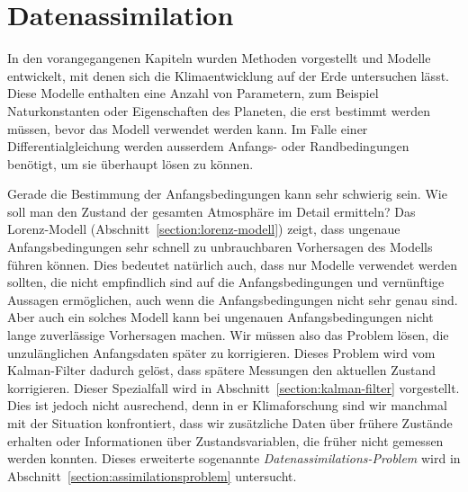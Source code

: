 %
%
%
\chapter{Datenassimilation\label{chapter:assimilation}}
In den vorangegangenen Kapiteln wurden Methoden vorgestellt
und Modelle entwickelt, mit denen sich die Klimaentwicklung auf der
Erde untersuchen lässt.
Diese Modelle enthalten eine Anzahl von Parametern, zum Beispiel
Naturkonstanten oder Eigenschaften des Planeten, die erst bestimmt
werden müssen, bevor das Modell verwendet werden kann.
Im Falle einer Differentialgleichung werden ausserdem Anfangs-
oder Randbedingungen benötigt, um sie überhaupt lösen zu können.

Gerade die Bestimmung der Anfangsbedingungen kann sehr schwierig sein.
Wie soll man den Zustand der gesamten Atmosphäre im Detail ermitteln?
Das Lorenz-Modell (Abschnitt~\ref{section:lorenz-modell}) zeigt, dass
ungenaue Anfangsbedingungen sehr schnell zu unbrauchbaren Vorhersagen
des Modells führen können.
Dies bedeutet natürlich auch, dass nur Modelle verwendet werden sollten,
die nicht empfindlich sind auf die Anfangsbedingungen und vernünftige
Aussagen ermöglichen, auch wenn die Anfangsbedingungen nicht sehr genau 
sind.
Aber auch ein solches Modell kann bei ungenauen Anfangsbedingungen 
nicht lange zuverlässige Vorhersagen machen.
Wir müssen also das Problem lösen, die unzulänglichen Anfangsdaten 
später zu korrigieren.
Dieses Problem wird vom Kalman-Filter dadurch gelöst, dass spätere
Messungen den aktuellen Zustand korrigieren.
Dieser Spezialfall wird in Abschnitt~\ref{section:kalman-filter}
vorgestellt.
Dies ist jedoch nicht ausrechend, denn in er Klimaforschung sind wir
manchmal mit der Situation konfrontiert, dass wir zusätzliche
Daten über frühere Zustände erhalten oder Informationen über Zustandsvariablen,
die früher nicht gemessen werden konnten.
Dieses erweiterte sogenannte {\em Datenassimilations-Problem} wird in
Abschnitt~\ref{section:assimilationsproblem} untersucht.







